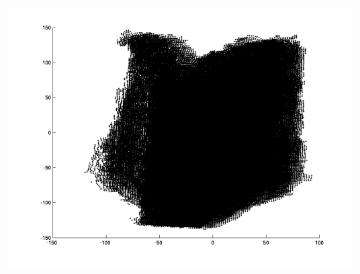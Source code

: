 \begin{figure}
\begin{subfigure}[b]{0.3\textwidth}
		\includegraphics[width=\textwidth]{Images/Book18.png}
		\caption{}
	\end{subfigure}	
	

\end{figure}
